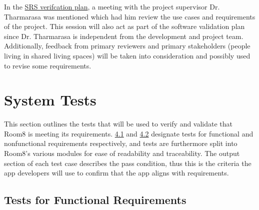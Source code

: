 \documentclass[12pt, titlepage]{article}
\begin{document}



In the \hyperref[section:SRSVerificationPlan]{SRS verifcation plan}, a meeting with the project supervisor Dr. Tharmarasa was mentioned which had him review the use cases and requirements of the project. This session will also act as part of the software validation plan since Dr. Tharmarasa is independent from the development and project team. Additionally, feedback from primary reviewers and primary stakeholders (people living in shared living spaces) will be taken into consideration and possibly used to revise some requirements.  
\section{System Tests}
\label{section:systemTests}

This section outlines the tests that will be used to verify and validate that Room8 is meeting its requirements. \hyperref[subsec:testsForFunc]{4.1} and \hyperref[subsec:testsForNonFunc]{4.2} designate tests for functional and nonfunctional requirements respectively, and tests are furthermore split into Room8's various modules for ease of readability and traceability. The output section of each test case describes the pass condition, thus this is the criteria the app developers will use to confirm that the app aligns with requirements. 

\subsection{Tests for Functional Requirements}
\label{subsec:testsForFunc}
\end{document}
